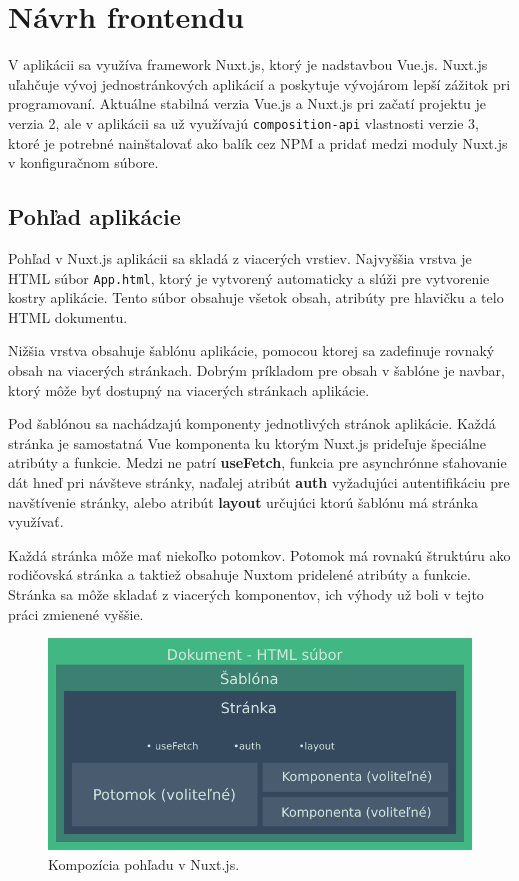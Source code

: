 \section{Návrh frontendu}
V aplikácii sa využíva framework Nuxt.js, ktorý je nadstavbou Vue.js. Nuxt.js uľahčuje vývoj jednostránkových aplikácií a poskytuje vývojárom lepší zážitok pri programovaní. 
Aktuálne stabilná verzia Vue.js a Nuxt.js pri začatí projektu je verzia 2, ale v aplikácii sa už využívajú \texttt{composition-api} vlastnosti verzie 3, ktoré je potrebné nainštalovať ako balík cez NPM a pridať medzi moduly Nuxt.js v konfiguračnom súbore.

\subsection{Pohľad aplikácie}
Pohľad v Nuxt.js aplikácii sa skladá z viacerých vrstiev. Najvyššia vrstva je HTML súbor \texttt{App.html}, ktorý je vytvorený automaticky a slúži pre vytvorenie kostry aplikácie. Tento súbor obsahuje všetok obsah, atribúty pre hlavičku a telo HTML dokumentu. 

Nižšia vrstva obsahuje šablónu aplikácie, pomocou ktorej sa zadefinuje rovnaký obsah na viacerých stránkach. Dobrým príkladom pre obsah v šablóne je navbar, ktorý môže byť dostupný na viacerých stránkach aplikácie. 

Pod šablónou sa nachádzajú komponenty jednotlivých stránok aplikácie. Každá stránka je samostatná Vue komponenta ku ktorým Nuxt.js prideľuje špeciálne atribúty a funkcie. Medzi ne patrí \textbf{useFetch}, funkcia pre asynchrónne sťahovanie dát hneď pri návšteve stránky, naďalej atribút \textbf{auth} vyžadujúci autentifikáciu pre navštívenie stránky, alebo atribút \textbf{layout} určujúci ktorú šablónu má stránka využívať.

Každá stránka môže mať niekoľko potomkov. Potomok má rovnakú štruktúru ako rodičovská stránka a taktiež obsahuje Nuxtom pridelené atribúty a funkcie. Stránka sa môže skladať z viacerých komponentov, ich výhody už boli v tejto práci zmienené vyššie.

    \begin{figure}[!hbt]
        \centering
        \includegraphics[scale=0.4]{obrazky/nuxt_struktura.png}
        \caption{Kompozícia pohľadu v Nuxt.js.}
        \label{pic:nuxt_strukture}
    \end{figure}


